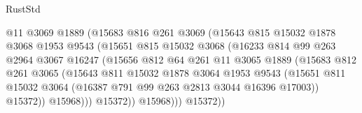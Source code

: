 \begin{lexlean}{RustStd}
\begin{coremodule}
                                  @11
                                  @3069
                                  @1889
                                  (@15683
                                    @816
                                    @261
                                    @3069
                                    (@15643
                                      @815
                                      @15032
                                      @1878
                                      @3068
                                      @1953
                                      @9543
                                      (@15651
                                        @815
                                        @15032
                                        @3068
                                        (@16233
                                          @814
                                          @99
                                          @263
                                          @2964
                                          @3067
                                          @16247
                                          (@15656
                                            @812
                                            @64
                                            @261
                                            @11
                                            @3065
                                            @1889
                                            (@15683
                                              @812
                                              @261
                                              @3065
                                              (@15643
                                                @811
                                                @15032
                                                @1878
                                                @3064
                                                @1953
                                                @9543
                                                (@15651
                                                  @811
                                                  @15032
                                                  @3064
                                                  (@16387 @791 @99 @263 @2813 @3044 @16396 @17003))
                                                @15372))
                                            @15968)))
                                      @15372))
                                  @15968)))
                            @15372))

\end{coremodule}
\end{lexlean}
